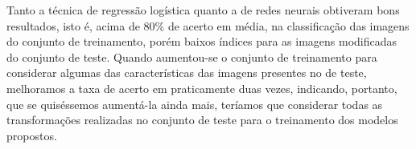 \documentclass[10pt,twocolumn,letterpaper]{article}
\begin{document}
Tanto a técnica de regressão logística quanto a de redes neurais obtiveram bons resultados, isto é, acima de 80\% de acerto em média, na classificação das imagens do conjunto de treinamento, porém baixos índices para as imagens modificadas do conjunto de teste. Quando aumentou-se o conjunto de treinamento para considerar algumas das características das imagens presentes no de teste, melhoramos a taxa de acerto em praticamente duas vezes, indicando, portanto, que se quiséssemos aumentá-la ainda mais, teríamos que considerar todas as transformações realizadas no conjunto de teste para o treinamento dos modelos propostos.

{\small


}
\end{document}

